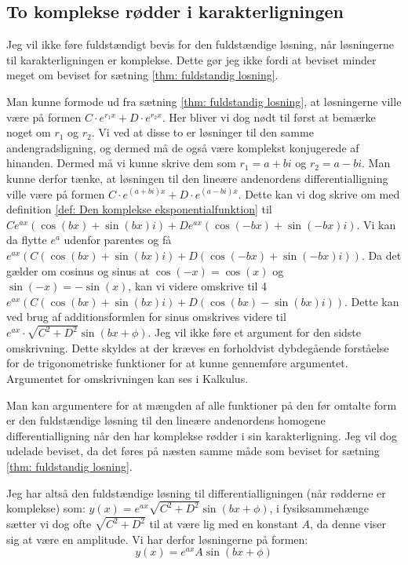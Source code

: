 \subsection{To komplekse rødder i karakterligningen}
Jeg vil ikke føre fuldstændigt bevis for den fuldstændige løsning, når løsningerne til karakterligningen er komplekse. 
Dette gør jeg ikke fordi at beviset minder meget om beviset for sætning \ref{thm: fuldstandig losning}.

Man kunne formode ud fra sætning \ref{thm: fuldstandig losning}, at løsningerne ville være på formen $C\cdot e^{r_1 x} + D \cdot e^{r_2 x}$.
Her bliver vi dog nødt til først at bemærke noget om $r_1$ og $r_2$.
Vi ved at disse to er løsninger til den samme andengradsligning, og dermed må de også være komplekst konjugerede af hinanden. 
Dermed må vi kunne skrive dem som $r_1 = a + bi$ og $r_2 = a-bi$. 
Man kunne derfor tænke, at løsningen til den lineære andenordens differentialligning ville være på formen $C\cdot e^{(a+bi) x} + D \cdot e^{(a-bi)x}$.
Dette kan vi dog skrive om med definition \ref{def: Den komplekse eksponentialfunktion} til $Ce^{ax}(\cos(bx) + \sin(bx) i) + De^{ax}(\cos(-bx) + \sin(-bx) i)$.
Vi kan da flytte $e^{a}$ udenfor parentes og få 
$e^{ax}(C(\cos(bx) + \sin(bx) i) + D(\cos(-bx) + \sin(-bx) i))$.
Da det gælder om cosinus og sinus at $\cos(-x)=\cos(x)$ og $\sin(-x)=-\sin(x)$, kan vi videre omskrive til 4
$e^{ax}(C(\cos(bx) + \sin(bx) i) + D(\cos(bx) - \sin(bx) i))$. 
Dette kan ved brug af additionsformlen for sinus omskrives videre til $e^{ax}\cdot \sqrt{C^2 + D^2}\sin(bx+\phi)$. 
Jeg vil ikke føre et argument for den sidste omskrivning.
Dette skyldes at der kræves en forholdvist dybdegående forståelse for de trigonometriske funktioner for at kunne gennemføre argumentet. 
Argumentet for omskrivningen kan ses i Kalkulus.

Man kan argumentere for at mængden af alle funktioner på den før omtalte form er den fuldstændige løsning til den lineære andenordens homogene differentialligning når den har komplekse rødder i sin karakterligning. 
Jeg vil dog udelade beviset, da det føres på næsten samme måde som beviset for sætning \ref{thm: fuldstandig losning}. 

Jeg har altså den fuldstændige løsning til differentialligningen (når rødderne er komplekse) som:
$y(x) = e^{ax}\sqrt{C^2 + D^2}\sin(bx+\phi)$, i fysiksammehænge sætter vi dog ofte $\sqrt{C^2 + D^2}$ til at være lig med en konstant $A$, da denne viser sig at være en amplitude. 
Vi har derfor løsningerne på formen:
$$y(x) = e^{ax}A\sin(bx+\phi)$$


